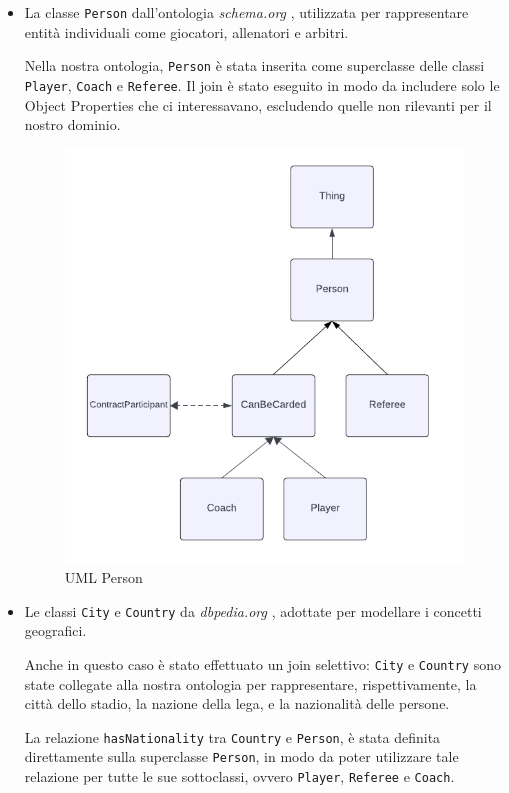 \documentclass[11pt]{report} %
\begin{document}
\begin{itemize}
    \item La classe \texttt{Person} dall'ontologia \textit{schema.org} \cite{schema}, utilizzata per rappresentare entità individuali come giocatori, allenatori e arbitri. 
    
    Nella nostra ontologia, \texttt{Person} è stata inserita come superclasse delle classi \texttt{Player}, \texttt{Coach} e \texttt{Referee}. Il join è stato eseguito in modo da includere solo le Object Properties che ci interessavano, escludendo quelle non rilevanti per il nostro dominio.

    \begin{figure}[H]
        \centering
        \includegraphics[width=0.8\linewidth]{PERSON.png}
        \caption{UML Person}
    \end{figure}
    \newpage
    \item Le classi \texttt{City} e \texttt{Country} da \textit{dbpedia.org} \cite{dbpedia}, adottate per modellare i concetti geografici. 
  
    Anche in questo caso è stato effettuato un join selettivo: \texttt{City} e \texttt{Country} sono state collegate alla nostra ontologia per rappresentare, rispettivamente, la città dello stadio, la nazione della lega, e la nazionalità delle persone.
    
    La relazione \texttt{hasNationality} tra \texttt{Country} e \texttt{Person}, è stata definita direttamente sulla superclasse \texttt{Person}, in modo da poter utilizzare tale relazione per tutte le sue sottoclassi, ovvero \texttt{Player}, \texttt{Referee} e \texttt{Coach}.
\end{itemize}
\end{document}
